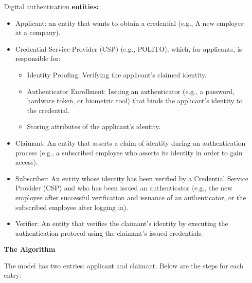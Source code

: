 \noindent Digital authentication \textbf{entities:} 
\begin{itemize}
    \item Applicant: an entity that wants to obtain a credential (e.g., A new employee at a company).
    \item Credential Service Provider (CSP) (e.g., POLITO), which, for applicants, is responsible for:
    \begin{itemize}
        \item Identity Proofing: Verifying the applicant's claimed identity.
        \item Authenticator Enrollment: Issuing an authenticator (e.g., a password, hardware token, or biometric tool) that binds the applicant's identity to the credential.
        \item Storing attributes of the applicant's identity.
    \end{itemize}
    \item Claimant: An entity that asserts a claim of identity during an authentication process (e.g., a subscribed employee who asserts its identity in order to gain access).
    \item Subscriber: An entity whose identity has been verified by a Credential Service Provider (CSP) and who has been issued an authenticator (e.g., the new employee after successful verification and issuance of an authenticator, or the subscribed employee after logging in).
    \item Verifier: An entity that verifies the claimant's identity by executing the authentication protocol using the claimant's issued credentials.
\end{itemize}

\hfill

\begin{center}
    \textbf{The Algorithm}
\end{center}

The model has two entries: applicant and claimant. Below are the steps for each entry:

